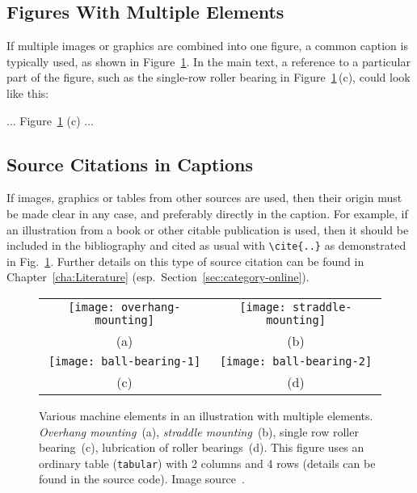 \subsection{Figures With Multiple Elements}

If multiple images or graphics are combined into one figure, a common caption
is typically used, as shown in Figure~\ref{fig:Bearings}. In the main text, a
reference to a particular part of the figure, such as the single-row roller
bearing in Figure~\ref{fig:Bearings}\,(c), could look like this:
%
\begin{LaTeXCode}[numbers=none]
... Figure~\ref{fig:Bearings} (c) ...
\end{LaTeXCode}

\subsection{Source Citations in Captions}
\label{sec:SourceCitationsInCaptions}

If images, graphics or tables from other sources are used, then their origin
must be made clear in any case, and preferably directly in the caption. For
example, if an illustration from a book or other citable publication is used,
then it should be included in the bibliography and cited as usual with
\verb!\cite{..}! as demonstrated in Fig.\ \ref{fig:Bearings}. Further details
on this type of source citation can be found in Chapter~\ref{cha:Literature}
(esp.\ Section~\ref{sec:category-online}).

\begin{figure}
    \centering\small
    \begin{tabular}{@{}c@{\hspace{12mm}}c@{}} %
        \texttt{[image: overhang-mounting]} &
        \texttt{[image: straddle-mounting]}
        \\
        (a) & (b)
        \\[4pt]    %
        \texttt{[image: ball-bearing-1]} &
        \texttt{[image: ball-bearing-2]}
        \\
        (c) & (d)
    \end{tabular}
%
\caption{Various machine elements in an illustration with multiple elements.
\emph{Overhang mounting}~(a), \emph{straddle mounting}~(b), single row roller
bearing~(c), lubrication of roller bearings~(d). This figure uses an ordinary
table (\texttt{tabular}) with 2 columns and 4 rows (details can be found in
the source code). Image source~\cite{Faires1934}.}
\label{fig:Bearings}
\end{figure}


